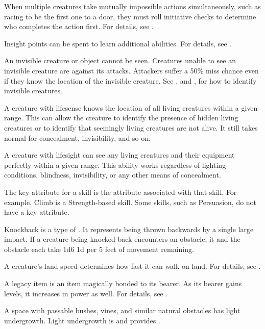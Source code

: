  When multiple creatures take mutually impossible actions simultaneously, such as racing to be the first one to a door, they must roll initiative checks to determine who completes the action first.
For details, see .

 Insight points can be spent to learn additional abilities.
For details, see .

 An invisible creature or object cannot be seen. Creatures unable to see an invisible creature are  against its attacks. Attackers suffer a 50\% miss chance even if they know the location of the invisible creature. See , and , for how to identify invisible creatures.

 A creature with lifesense knows the location of all living creatures within a given range.
This can allow the creature to identify the presence of hidden living creatures or to identify that seemingly living creatures are not alive.
It still takes normal  for concealment, invisibility, and so on.

 A creature with lifesight can see any living creatures and their equipment perfectly within a given range.
This ability works regardless of lighting conditions, blindness, invisibility, or any other means of concealment.

 The key attribute for a skill is the attribute associated with that skill.
For example, Climb is a Strength-based skill.
Some skills, such as Persuasion, do not have a key attribute.

 Knockback is a type of .
It represents being thrown backwards by a single large impact.
If a creature being knocked back encounters an obstacle, it and the obstacle each take 1d6  \add 1d per 5 feet of movement remaining.

 A creature's land speed determines how fast it can walk on land.
For details, see .

 A legacy item is an item magically bonded to its bearer.
As its bearer gains levels, it increases in power as well.
For details, see .

 A space with passable bushes, vines, and similar natural obstacles has light undergrowth.
Light undergrowth is  and provides .

